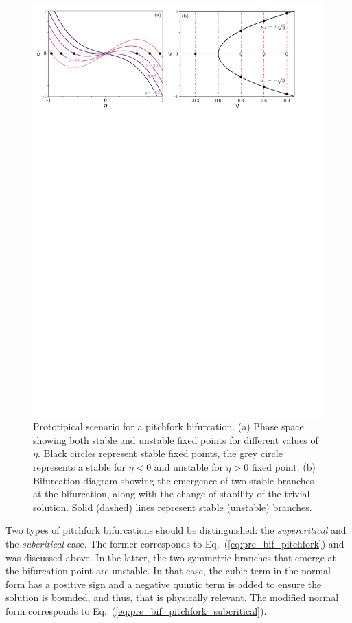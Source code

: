 \begin{figure}[h]
    \centering
    \includegraphics[width=\textwidth]{imagenes/framework/bif_pitch_f.pdf}
    \caption{Prototipical scenario for a pitchfork bifurcation. (a) Phase space
    showing both stable and unstable fixed points for different values of $\eta$. 
    Black circles represent stable fixed points, the grey circle represents a stable for $\eta < 0$
    and unstable for $\eta > 0$ fixed point. (b) Bifurcation diagram showing
    the emergence of two stable branches at the bifurcation, along with the change of
    stability of the trivial solution. Solid (dashed) lines represent
    stable (unstable) branches.}
    \label{fig:pre_bif_pitchfork}
\end{figure}

Two types of pitchfork bifurcations should be distinguished: the {\em supercritical} 
and the {\em subcritical} case. The former corresponds to Eq.~(\ref{eq:pre_bif_pitchfork})
and was discussed above. In the latter, the two symmetric branches that emerge at the bifurcation
point are unstable. In that case, the cubic term in the normal form has a positive sign and
a negative quintic term is added to ensure the solution is bounded, and thus, that is physically
relevant. The modified normal form corresponds to Eq.~(\ref{eq:pre_bif_pitchfork_subcritical}).

